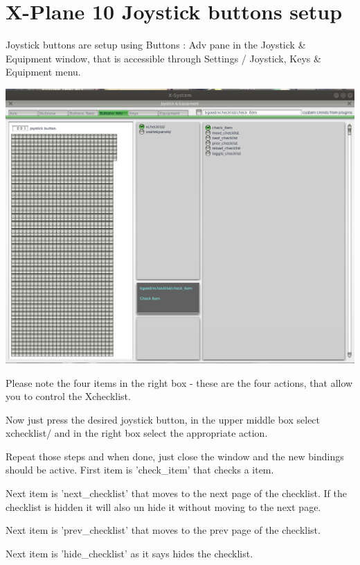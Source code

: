 \documentclass[11pt,parskip=half,a4paper]{scrartcl}
\begin{document}
\newpage
\section{X-Plane 10 Joystick buttons setup}

Joystick buttons are setup using Buttons : Adv pane in the Joystick \& Equipment window, that is accessible through Settings / Joystick, Keys \& Equipment menu.

\begin{center}
\includegraphics[width=16cm]{XP10_JoystickButtonsSetup.png}
\end{center}

Please note the four items in the right box - these are the four actions, that allow you to control the Xchecklist. \newline

Now just press the desired joystick button, in the upper middle box select xchecklist/ and in the right 
box select the appropriate action. \newline

Repeat those steps and when done, just close the window and the new bindings should be active. 
First item is 'check\_item' that checks a item. 

\newpage
Next item is 'next\_checklist' that moves to the next page of the checklist. If the checklist is hidden it 
will also un hide it without moving to the next page. 

Next item is 'prev\_checklist' that moves to the prev page of the checklist.

Next item is 'hide\_checklist' as it says hides the checklist.
\end{document}
